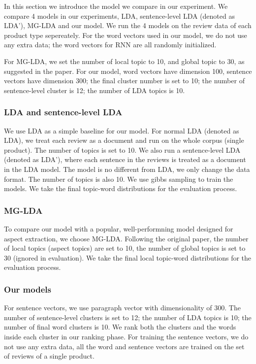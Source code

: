 In this section we introduce the model we compare in our experiment. We compare 4 models in our experiments, LDA, sentence-level LDA (denoted as LDA'), MG-LDA and our model. We run the 4 models on the review data of each product type sepereately. For the word vectors used in our model, we do not use any extra data; the word vectors for RNN are all randomly initialized.

For MG-LDA, we set the number of local topic to 10, and global topic to 30, as suggested in the paper. For our model, word vectors have dimension 100, sentence vectors have dimension 300; the final cluster number is set to 10; the number of sentence-level cluster is 12; the number of LDA topics is 10. 

\subsubsection{LDA and sentence-level LDA}

We use LDA as a simple baseline for our model. For normal LDA (denoted as LDA), we treat each review as a document and run on the whole corpus (single product). The number of topics is set to 10. We also run a sentence-level LDA (denoted as LDA'), where each sentence in the reviews is treated as a document in the LDA model. The model is no different from LDA, we only change the data format. The number of topics is also 10. We use gibbs sampling to train the models. We take the final topic-word distributions for the evaluation process.

\subsubsection{MG-LDA}

To compare our model with a popular, well-performning model designed for aspect extraction, we choose MG-LDA. Following the original paper, the number of local topics (aspect topics) are set to 10, the number of global topics is set to 30 (ignored in evaluation). We take the final local topic-word distributions for the evaluation process.

\subsubsection{Our models}

For sentence vectors, we use paragraph vector with dimensionality of 300. The number of sentence-level clusters is set to 12; the number of LDA topics is 10; the number of final word clusters is 10. We rank both the clusters and the words inside each cluster in our ranking phase. For training the sentence vectors, we do not use any extra data, all the word and sentence vectors are trained on the set of reviews of a single product.


